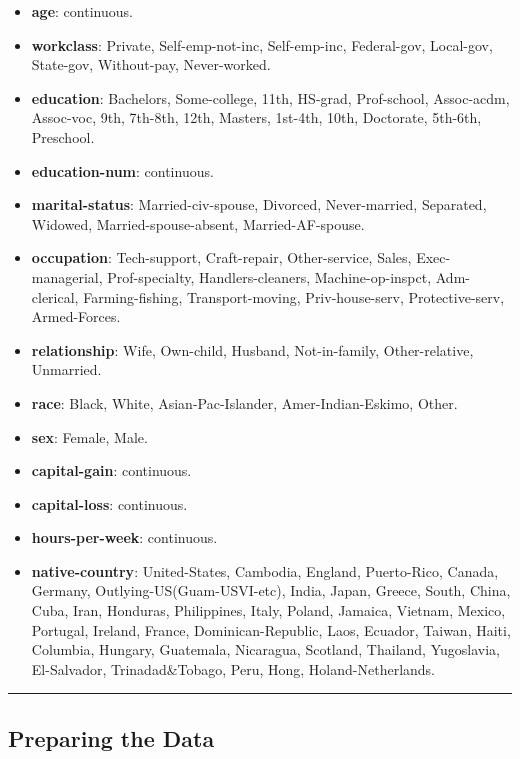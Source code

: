 \documentclass[11pt]{article}
\providecommand{\tightlist}{%
      \setlength{\itemsep}{0pt}\setlength{\parskip}{0pt}}
\begin{document}
\begin{itemize}
\tightlist
\item
  \textbf{age}: continuous.
\item
  \textbf{workclass}: Private, Self-emp-not-inc, Self-emp-inc,
  Federal-gov, Local-gov, State-gov, Without-pay, Never-worked.
\item
  \textbf{education}: Bachelors, Some-college, 11th, HS-grad,
  Prof-school, Assoc-acdm, Assoc-voc, 9th, 7th-8th, 12th, Masters,
  1st-4th, 10th, Doctorate, 5th-6th, Preschool.
\item
  \textbf{education-num}: continuous.
\item
  \textbf{marital-status}: Married-civ-spouse, Divorced, Never-married,
  Separated, Widowed, Married-spouse-absent, Married-AF-spouse.
\item
  \textbf{occupation}: Tech-support, Craft-repair, Other-service, Sales,
  Exec-managerial, Prof-specialty, Handlers-cleaners, Machine-op-inspct,
  Adm-clerical, Farming-fishing, Transport-moving, Priv-house-serv,
  Protective-serv, Armed-Forces.
\item
  \textbf{relationship}: Wife, Own-child, Husband, Not-in-family,
  Other-relative, Unmarried.
\item
  \textbf{race}: Black, White, Asian-Pac-Islander, Amer-Indian-Eskimo,
  Other.
\item
  \textbf{sex}: Female, Male.
\item
  \textbf{capital-gain}: continuous.
\item
  \textbf{capital-loss}: continuous.
\item
  \textbf{hours-per-week}: continuous.
\item
  \textbf{native-country}: United-States, Cambodia, England,
  Puerto-Rico, Canada, Germany, Outlying-US(Guam-USVI-etc), India,
  Japan, Greece, South, China, Cuba, Iran, Honduras, Philippines, Italy,
  Poland, Jamaica, Vietnam, Mexico, Portugal, Ireland, France,
  Dominican-Republic, Laos, Ecuador, Taiwan, Haiti, Columbia, Hungary,
  Guatemala, Nicaragua, Scotland, Thailand, Yugoslavia, El-Salvador,
  Trinadad\&Tobago, Peru, Hong, Holand-Netherlands.
\end{itemize}

    \begin{center}\rule{0.5\linewidth}{\linethickness}\end{center}

\subsection{Preparing the Data}\label{preparing-the-data}
\end{document}
